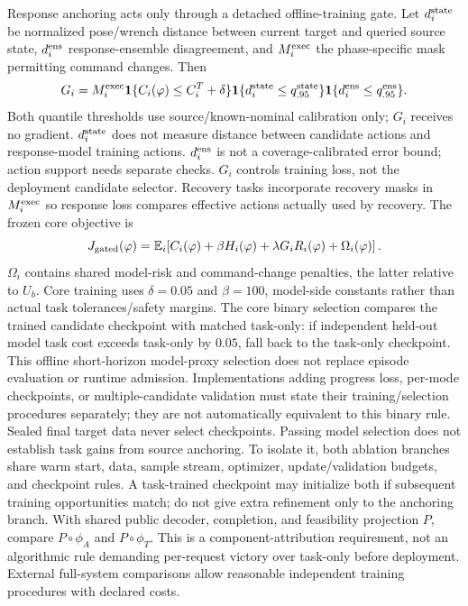 \documentclass[11pt]{article}
\newcommand{\E}{\mathbb E}
\newcommand{\ind}{\mathbf 1}
\begin{document}
Response anchoring acts only through a detached offline-training gate. Let
$d_i^{\rm state}$ be normalized pose/wrench distance between current target and queried
source state, $d_i^{\rm ens}$ response-ensemble disagreement, and $M_i^{\rm exec}$ the
phase-specific mask permitting command changes. Then
\begin{equation}
 G_i=M_i^{\rm exec}
 \ind\{C_i(\varphi)\le C_i^T+\delta\}
 \ind\{d_i^{\rm state}\le q_{.95}^{\rm state}\}
 \ind\{d_i^{\rm ens}\le q_{.95}^{\rm ens}\}.
 \label{eq:selective-gate}
\end{equation}
Both quantile thresholds use source/known-nominal calibration only; $G_i$ receives
no gradient. $d_i^{\rm state}$ does not measure distance between candidate actions
and response-model training actions. $d_i^{\rm ens}$ is not a coverage-calibrated error
bound; action support needs separate checks. $G_i$ controls training loss, not the
deployment candidate selector. Recovery tasks incorporate recovery masks in
$M_i^{\rm exec}$ so response loss compares effective actions actually used by recovery.
The frozen core objective is
\begin{equation}
 J_{\rm gated}(\varphi)=
 \E_i\!\left[C_i(\varphi)+\beta H_i(\varphi)
       +\lambda G_i R_i(\varphi)+\Omega_i(\varphi)\right].
 \label{eq:objective}
\end{equation}
$\Omega_i$ contains shared model-risk and command-change penalties, the latter relative
to $U_b$. Core training uses $\delta=0.05$ and $\beta=100$, model-side constants rather
than actual task tolerances/safety margins. The core binary selection compares the
trained candidate checkpoint with matched task-only: if independent held-out model
task cost exceeds task-only by $0.05$, fall back to the task-only checkpoint. This
offline short-horizon model-proxy selection does not replace episode evaluation or
runtime admission. Implementations adding progress loss, per-mode checkpoints, or
multiple-candidate validation must state their training/selection procedures separately;
they are not automatically equivalent to this binary rule. Sealed final target data
never select checkpoints. Passing model selection does not establish task gains from
source anchoring. To isolate it, both ablation branches share warm start, data, sample
stream, optimizer, update/validation budgets, and checkpoint rules. A task-trained
checkpoint may initialize both if subsequent training opportunities match; do not give extra refinement only to the
anchoring branch. With shared public decoder,
completion, and feasibility projection $P$, compare $P\circ\phi_A$ and $P\circ\phi_T$.
This is a component-attribution requirement, not an algorithmic rule demanding per-request
victory over task-only before deployment. External full-system comparisons allow
reasonable independent training procedures with declared costs.
\end{document}
